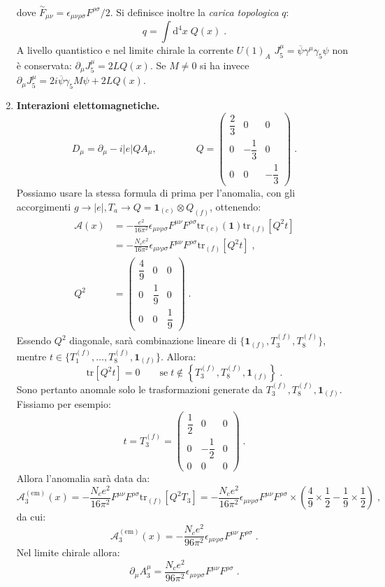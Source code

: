 \documentclass[12pt,a4paper]{article}
\theoremstyle{definition}
\newcommand{\diff}[1][]{\mathrm{d}#1}
\newcommand{\tr}{\mathrm{tr}}
\numberwithin{equation}{section}
\begin{document}
\begin{enumerate}
\begin{align*}
\end{align*}
dove $\stackrel{\sim}{F}_{\mu\nu}=\epsilon_{\mu\nu\rho\sigma}F^{\rho\sigma}/2$. Si definisce inoltre la \emph{carica topologica} $q$:
\begin{equation}
q=\int\diff^4{x}\;Q(x)\;.
\end{equation}
A livello quantistico e nel limite chirale la corrente $U(1)_A$ $J^{\mu}_5=\overline{\psi}\gamma^{\mu}\gamma_5\psi$ non è conservata: $\partial_{\mu}J^{\mu}_5=2LQ(x)$. Se $M\ne 0$ si ha invece $\partial_{\mu}J^{\mu}_5=2i\overline{\psi}\gamma_5M\psi+2LQ(x)$.
\item \textbf{Interazioni elettomagnetiche.}
$$
D_{\mu}=\partial_{\mu}-i|e|QA_{\mu},\qquad\qquad Q=\left(\begin{matrix}
\dfrac{2}{3} & 0 & 0 \\
0 & -\dfrac{1}{3} & 0 \\
0 & 0 & -\dfrac{1}{3}
\end{matrix}\right)\;.
$$
Possiamo usare la stessa formula di prima per l'anomalia, con gli accorgimenti $g\to |e|, T_a\to Q=\mathbf{1}_{(c)}\otimes Q_{(f)}$, ottenendo:
\begin{align*}
\mathcal{A}(x) &= -\frac{e^2}{16\pi^2}\epsilon_{\mu\nu\rho\sigma}F^{\mu\nu}F^{\rho\sigma}\tr_{(c)}(\mathbf{1})\tr_{(f)}[Q^2t] \\
&= -\frac{N_ce^2}{16\pi^2}\epsilon_{\mu\nu\rho\sigma}F^{\mu\nu}F^{\rho\sigma}\tr_{(f)}[Q^2t]\;, \\
Q^2 &= \left(\begin{matrix}
\dfrac{4}{9} & 0 & 0 \\
0 & \dfrac{1}{9} & 0 \\
0 & 0 & \dfrac{1}{9}
\end{matrix}\right)\;.
\end{align*}
Essendo $Q^2$ diagonale, sarà combinazione lineare di $\{\mathbf{1}_{(f)},T_3^{(f)},T_8^{(f)}\}$, mentre $t\in\{T_1^{(f)},\ldots,T_8^{(f)},\mathbf{1}_{(f)}\}$. Allora:
\begin{equation}
\tr[Q^2t]=0\qquad \mbox{se}\; t\not\in\left\{T_3^{(f)},T_8^{(f)},\mathbf{1}_{(f)}\right\}\;.
\end{equation}
Sono pertanto anomale solo le trasformazioni generate da $T_3^{(f)},T_8^{(f)},\mathbf{1}_{(f)}$. Fissiamo per esempio:
$$
t=T_3^{(f)}=\left(\begin{matrix}
\dfrac{1}{2} & 0 & 0 \\
0 & -\dfrac{1}{2} & 0 \\
0 & 0 & 0
\end{matrix}\right)\;.
$$
Allora l'anomalia sarà data da:
$$
\mathcal{A}_3^{(\mathrm{em})}(x)=-\frac{N_ce^2}{16\pi^2}F^{\mu\nu}F^{\rho\sigma}\tr_{(f)}[Q^2T_3]=-\frac{N_ce^2}{16\pi^2}\epsilon_{\mu\nu\rho\sigma}F^{\mu\nu}F^{\rho\sigma}\times \left(\frac{4}{9}\times \frac{1}{2}-\frac{1}{9}\times \frac{1}{2}\right)\;,
$$
da cui:
\begin{equation}
\boxed{
\mathcal{A}_3^{(\mathrm{em})}(x)=-\frac{N_ce^2}{96\pi^2}\epsilon_{\mu\nu\rho\sigma}F^{\mu\nu}F^{\rho\sigma}
}\;.
\end{equation}
Nel limite chirale allora:
$$
\partial_{\mu}A^{\mu}_3=\frac{N_ce^2}{96\pi^2}\epsilon_{\mu\nu\rho\sigma}F^{\mu\nu}F^{\rho\sigma}\;.
$$
\end{enumerate}
\end{document}
